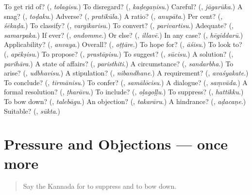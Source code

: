 \begin{tcolorbox}[breakable,colback=teal!4,colframe=teal!35!black,title={Before you move on}]
To get rid of? (\textbf{}, \emph{tolagisu}.) To disregard? (\textbf{}, \emph{kaḍegaṇisu}.) Careful? (\textbf{}, \emph{jāgarūka}.) A snag? (\textbf{}, \emph{toḍaku}.) Adverse? (\textbf{}, \emph{pratikūla}.) A ratio? (\textbf{}, \emph{anupāta}.) Per cent? (\textbf{}, \emph{śēkaḍa}.) To classify? (\textbf{}, \emph{vargīkarisu}.) To convert? (\textbf{}, \emph{parivartisu}.) Adequate? (\textbf{}, \emph{samarpaka}.) If ever? (\textbf{}, \emph{ondomme}.) Or else? (\textbf{}, \emph{illavē}.) In any case? (\textbf{}, \emph{hēgiddarū}.) Applicability? (\textbf{}, \emph{anvaya}.) Overall? (\textbf{}, \emph{oṭṭāre}.) To hope for? (\textbf{}, \emph{āśisu}.) To look to? (\textbf{}, \emph{apēkṣisu}.) To propose? (\textbf{}, \emph{prastāpisu}.) To suggest? (\textbf{}, \emph{sūcisu}.) A solution? (\textbf{}, \emph{parihāra}.) A state of affairs? (\textbf{}, \emph{paristhiti}.) A circumstance? (\textbf{}, \emph{sandarbha}.) To arise? (\textbf{}, \emph{udbhavisu}.) A stipulation? (\textbf{}, \emph{nibandhane}.) A requirement? (\textbf{}, \emph{avaśyakate}.) To conclude? (\textbf{}, \emph{tīrmānisu}.) To confer? (\textbf{}, \emph{samālōcisu}.) A dialogue? (\textbf{}, \emph{saṃvāda}.) A formal resolution? (\textbf{}, \emph{ṭharāvu}.) To include? (\textbf{}, \emph{oḷagoḷḷu}.) To suppress? (\textbf{}, \emph{hattikku}.) To bow down? (\textbf{}, \emph{talebāgu}.) An objection? (\textbf{}, \emph{takarāru}.) A hindrance? (\textbf{}, \emph{aḍacaṇe}.) Suitable? (\textbf{}, \emph{sūkta}.)
\end{tcolorbox}
\section[(dialogue)]{Pressure and Objections — once more}

\label{lesson:KA-R432-review-final-432}



\begin{quote}
Say the Kannada for to suppress and to bow down.
\end{quote}

